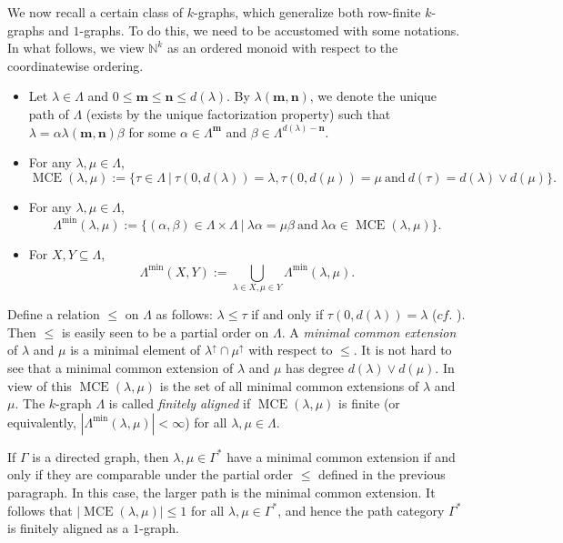\documentclass[a4paper,reqno,11pt]{amsart}
\numberwithin{equation}{section}
\theoremstyle{definition}
\theoremstyle{remark}
\newcommand{\MCE}{\operatorname{MCE}}
\newcommand{\N}{\mathbf{n}}
\newcommand{\M}{\mathbf{m}}
\begin{document}
We now recall a certain class of $k$-graphs, which generalize both row-finite $k$-graphs and $1$-graphs. To do this, we need to be accustomed with some notations. In what follows, we view $\mathbb{N}^k$ as an ordered monoid with respect to the coordinatewise ordering. 
\begin{itemize}
    \item[$\bullet$] Let $\lambda\in \Lambda$ and $0\le \M \le \N\le d(\lambda)$. By $\lambda(\M,\N)$, we denote the unique path of $\Lambda$ (exists by the unique factorization property) such that $\lambda=\alpha \lambda(\M,\N)\beta$ for some $\alpha\in \Lambda^{\M}$ and $\beta\in \Lambda^{d(\lambda)-\N}$.

    \item[$\bullet$] For any $\lambda,\mu\in \Lambda$, \[\MCE(\lambda,\mu):=\{\tau\in \Lambda~|~\tau(0,d(\lambda))=\lambda,\tau(0,d(\mu))=\mu~\text{and}~d(\tau)=d(\lambda)\vee d(\mu)\}.\] 

    \item[$\bullet$] For any $\lambda,\mu\in \Lambda$, \[\Lambda^{\min}(\lambda,\mu):=\{(\alpha,\beta)\in \Lambda\times \Lambda~|~\lambda\alpha=\mu\beta~\text{and}~\lambda\alpha\in \MCE(\lambda,\mu)\}.\]

    \item[$\bullet$] For $X,Y\subseteq \Lambda$, \[\Lambda^{\min}(X,Y):=\displaystyle{\bigcup_{\lambda\in X,\mu\in Y}}\Lambda^{\min}(\lambda,\mu).\]
\end{itemize}
Define a relation $\leqslant$ on $\Lambda$ as follows: $\lambda\leqslant \tau$ if and only if $\tau(0,d(\lambda))=\lambda$ ($cf.$ \cite[Definition 1.2]{Ortega}). Then $\leqslant$ is easily seen to be a partial order on $\Lambda$. A \emph{minimal common extension} of $\lambda$ and $\mu$ is a minimal element of $\lambda^{\uparrow}\cap \mu^{\uparrow}$ with respect to $\leqslant$. It is not hard to see that a minimal common extension of $\lambda$ and $\mu$ has degree $d(\lambda)\vee d(\mu)$. In view of this $\MCE(\lambda,\mu)$ is the set of all minimal common extensions of $\lambda$ and $\mu$. The $k$-graph $\Lambda$ is called \emph{finitely aligned} if $\MCE(\lambda,\mu)$ is finite (or equivalently, $|\Lambda^{\min}(\lambda,\mu)|<\infty$) for all $\lambda,\mu\in \Lambda$.

If $\Gamma$ is a directed graph, then $\lambda,\mu\in \Gamma^*$ have a minimal common extension if and only if they are comparable under the partial order $\leqslant$ defined in the previous paragraph. In this case, the larger path is the minimal common extension. It follows that $|\MCE(\lambda,\mu)|\le 1$ for all $\lambda,\mu\in \Gamma^*$, and hence the path category $\Gamma^*$ is finitely aligned as a $1$-graph.  
\end{document}
